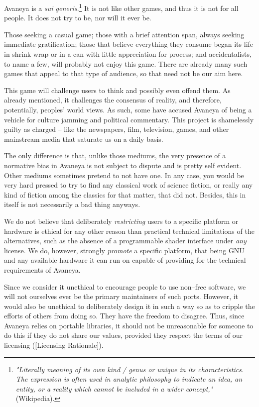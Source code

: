 Avaneya is a {\it sui generis}.\footnote{{\it "Literally meaning of its own kind / genus or unique in its characteristics. The expression is often used in analytic philosophy to indicate an idea, an entity, or a reality which cannot be included in a wider concept,"} (Wikipedia).} It is not like other games, and thus it is not for all people. It does not try to be, nor will it ever be.

Those seeking a casual game; those with a brief attention span, always seeking immediate gratification; those that believe everything they consume began its life in shrink wrap or in a can with little appreciation for process; and accidentalists, to name a few, will probably not enjoy this game. There are already many such games that appeal to that type of audience, so that need not be our aim here.

This game will challenge users to think and possibly even offend them. As already mentioned, it challenges the consensus of reality, and therefore, potentially, peoples' world views. As such, some have accused Avaneya of being a vehicle for culture jamming and political commentary. This project is shamelessly guilty as charged -- like the newspapers, film, television, games, and other mainstream media that saturate us on a daily basis. 

The only difference is that, unlike those mediums, the very presence of a normative bias in Avaneya is not subject to dispute and is pretty self evident. Other mediums sometimes pretend to not have one. In any case, you would be very hard pressed to try to find any classical work of science fiction, or really any kind of fiction among the classics for that matter, that did not. Besides, this in itself is not necessarily a bad thing anyways.

We do not believe that deliberately {\it restricting} users to a specific platform or hardware is ethical for any other reason than practical technical limitations of the alternatives, such as the absence of a programmable shader interface under {\it any} license. We do, however, strongly {\it promote} a specific platform, that being GNU and any available hardware it can run on capable of providing for the technical requirements of Avaneya.

Since we consider it unethical to encourage people to use non--free software, we will not ourselves ever be the primary maintainers of such ports. However, it would also be unethical to deliberately design it in such a way so as to cripple the efforts of others from doing so. They have the freedom to disagree. Thus, since Avaneya relies on portable libraries, it should not be unreasonable for someone to do this if they do not share our values, provided they respect the terms of our licensing ([Licensing Rationale]).

